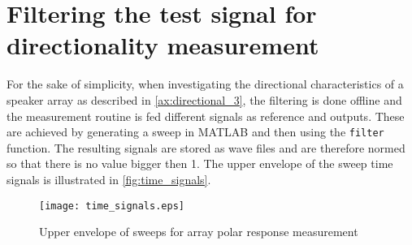 \section{Filtering the test signal for directionality measurement}\label{sec:signal_filtering}
For the sake of simplicity, when investigating the directional characteristics of a speaker array as described in \autoref{ax:directional_3}, the filtering is done offline and the measurement routine is fed different signals as reference and outputs. These are achieved by generating a sweep in MATLAB and then using the \texttt{filter} function. The resulting signals are stored as wave files and are therefore normed so that there is no value bigger then 1.
The upper envelope of the sweep time signals is illustrated in \autoref{fig:time_signals}.
\begin{figure}[H]
	\centering
	\texttt{[image: time\_signals.eps]}
	\caption{Upper envelope of sweeps for array polar response measurement}
		\label{fig:time_signal}
\end{figure}